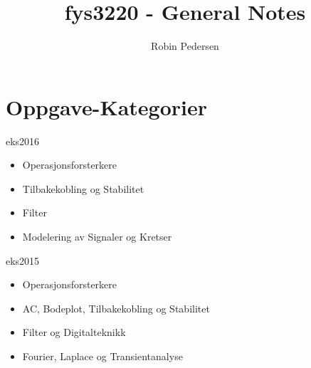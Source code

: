 \documentclass{article}
\begin{document}
  \title{fys3220 - General Notes}
  \author{Robin Pedersen}
  \maketitle

  \section{Oppgave-Kategorier}
    eks2016
    \begin{itemize}
      \item Operasjonsforsterkere
      \item Tilbakekobling og Stabilitet
      \item Filter
      \item Modelering av Signaler og Kretser
    \end{itemize}

    eks2015
    \begin{itemize}
      \item Operasjonsforsterkere
      \item AC, Bodeplot, Tilbakekobling og Stabilitet
      \item Filter og Digitalteknikk
      \item Fourier, Laplace og Transientanalyse
    \end{itemize}
\end{document}
